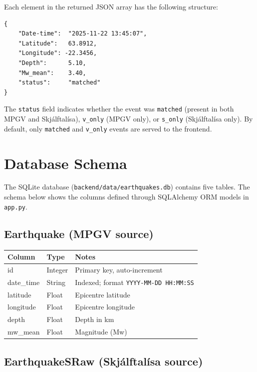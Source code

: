 \documentclass[12pt]{article}
\begin{document}
Each element in the returned JSON array has the following structure:

\begin{verbatim}
{
    "Date-time":  "2025-11-22 13:45:07",
    "Latitude":   63.8912,
    "Longitude": -22.3456,
    "Depth":      5.10,
    "Mw_mean":    3.40,
    "status":     "matched"
}
\end{verbatim}

The \texttt{status} field indicates whether the event was \texttt{matched} (present in both MPGV and Skjálftalísa), \texttt{v\_only} (MPGV only), or \texttt{s\_only} (Skjálftalísa only). By default, only \texttt{matched} and \texttt{v\_only} events are served to the frontend.

\clearpage
\section{Database Schema}
\label{app:schema}

The SQLite database (\texttt{backend/data/earthquakes.db}) contains five tables. The schema below shows the columns defined through SQLAlchemy ORM models in \texttt{app.py}.

\subsection*{Earthquake (MPGV source)}

\begin{table}[H]
\centering
\small
\begin{tabular}{l l l}
\hline
\textbf{Column} & \textbf{Type} & \textbf{Notes} \\
\hline
id        & Integer & Primary key, auto-increment \\
date\_time & String  & Indexed; format \texttt{YYYY-MM-DD HH:MM:SS} \\
latitude  & Float   & Epicentre latitude \\
longitude & Float   & Epicentre longitude \\
depth     & Float   & Depth in km \\
mw\_mean  & Float   & Magnitude (Mw) \\
\hline
\end{tabular}
\end{table}

\subsection*{EarthquakeSRaw (Skjálftalísa source)}
\end{document}
